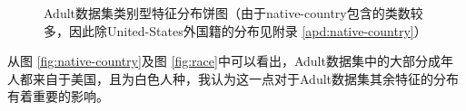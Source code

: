\documentclass[12pt,a4paper]{article}
\theoremstyle{definition}
\begin{document}
\begin{figure}[H]
	\centering
	\caption{Adult数据集类别型特征分布饼图（由于native-country包含的类数较多，因此除United-States外国籍的分布见附录 \ref{apd:native-country}）}
	\label{fig:class_feature_dis2}
\end{figure}

从图 \ref{fig:native-country}及图 \ref{fig:race}中可以看出，Adult数据集中的大部分成年人都来自于美国，且为白色人种，我认为这一点对于Adult数据集其余特征的分布有着重要的影响。
\end{document}

